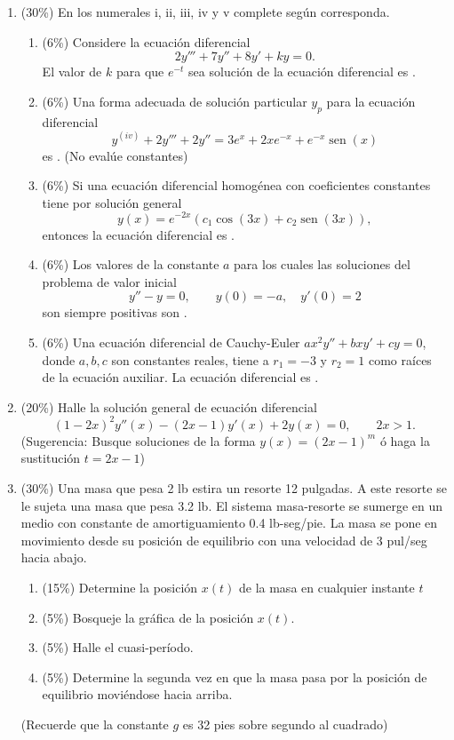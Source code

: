 \documentclass[11pt]{article}
\begin{document}
\vspace{10pt}
\begin{enumerate}
\item{} (30\%) En los numerales i, ii, iii, iv y v complete según corresponda.
\begin{enumerate}
\item{} (6\%) Considere la ecuación diferencial
\[
2y'''+7y''+8y'+ky=0.
\]
\noindent El valor de $k$ para que $e^{-t}$ sea solución de la ecuación diferencial es \dotfill.

\item{} (6\%) Una forma adecuada de solución particular $y_p$ para la ecuación diferencial
\[
y^{(iv)}+2y'''+2y'' = 3e^x+2xe^{-x}+e^{-x}\operatorname{sen}(x)
\]
\noindent es \dotfill. (No evalúe constantes)

\item{} (6\%) Si una ecuación diferencial homogénea con coeficientes constantes tiene por solución general
\[
y(x) = e^{-2x}\left(c_1\cos(3x)+c_2\operatorname{sen}(3x)\right),
\]
\noindent entonces la ecuación diferencial es \dotfill.

\item{} (6\%) Los valores de la constante $a$ para los cuales las soluciones del problema de valor inicial
\[
y''-y=0, \qquad y(0)=-a,\quad y'(0)=2
\]
\noindent son siempre positivas son \dotfill.

\item{} (6\%) Una ecuación diferencial de Cauchy-Euler $ax^2y''+bxy'+cy=0$, donde $a,b,c$ son constantes reales, tiene a $r_1=-3$ y $r_2=1$ como raíces de la ecuación auxiliar. La ecuación diferencial es \dotfill.
\end{enumerate}

\item{} (20\%) Halle la solución general de ecuación diferencial
\[
(1-2x)^2y''(x)-(2x-1)y'(x)+2y(x)=0, \qquad 2x>1.
\]
\noindent (Sugerencia: Busque soluciones de la forma $y(x)=(2x-1)^m$ ó haga la sustitución $t=2x-1$)

\vspace{6cm}

\newpage
\item{} (30\%) Una masa que pesa 2 lb estira un resorte 12 pulgadas. A este resorte se le sujeta una masa que pesa 3.2 lb. El sistema masa-resorte se sumerge en un medio con constante de amortiguamiento 0.4 lb-seg/pie. La masa se pone en movimiento desde su posición de equilibrio con una velocidad de 3 pul/seg hacia abajo.
\begin{enumerate}
\item{} (15\%) Determine la posición $x(t)$ de la masa en cualquier instante $t$
\item{} (5\%) Bosqueje la gráfica de la posición $x(t)$.
\item{} (5\%) Halle el cuasi-período.
\item{} (5\%) Determine la segunda vez en que la masa pasa por la posición de equilibrio moviéndose hacia arriba.
\end{enumerate}
\noindent (Recuerde que la constante $g$ es 32 pies sobre segundo al cuadrado)


\end{enumerate}
\end{document}
